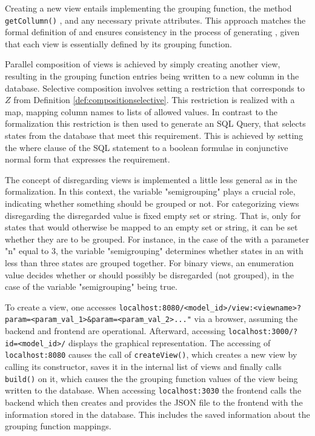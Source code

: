 \documentclass[preview]{standalone}
\begin{document}
Creating a new view entails implementing the grouping function, the method \texttt{getCollumn()} , and any necessary private attributes. This approach matches the formal definition of \viewsN and ensures consistency in the process of generating \viewsN, given that each view is essentially defined by its grouping function.

Parallel composition of views is achieved by simply creating another view, resulting in the grouping function entries being written to a new column in the database. Selective composition involves setting a  restriction that corresponds to $Z$ from Definition \ref{def:compositionselective}. This restriction is realized with a map, mapping column names to lists of allowed values. In contrast to the formalization this restriction is then used to generate an SQL Query, that selects states from the database that meet this requirement. This is achieved by setting the where clause of the SQL statement to a boolean formulae in conjunctive normal form that expresses the requirement.

The concept of disregarding views is implemented a little less general as in the formalization. In this context, the variable "semigrouping" plays a crucial role, indicating whether something should be grouped or not. For categorizing views disregarding the disregarded value is fixed empty set or string. That is, only for states that would otherwise be mapped to an empty set or string, it can be set whether they are to be grouped. For instance, in the case of the \viewN \viewscc with a parameter "n" equal to 3, the variable "semigrouping" determines whether states in an \sccN with less than three states are grouped together. For binary views, an enumeration value decides whether \hasppty or \notppty should possibly be disregarded (not grouped), in the case of the variable "semigrouping" being true.

To create a view, one accesses \nolinkurl{localhost:8080/<model\_id>/view:<viewname>?param=<param\_val\_1>\&param=<param\_val\_2>..."} via a browser, assuming the backend and frontend are operational. Afterward, accessing \nolinkurl{localhost:3000/?id=<model\_id>/} displays the graphical \viewN representation. The accessing of \nolinkurl{localhost:8080} causes the call of \texttt{createView()}, which creates a new view by calling its constructor, saves it in the internal list of views and finally calls \texttt{build()} on it, which causes the the grouping function values of the view being written to the database. When accessing \nolinkurl{localhost:3030} the frontend calls the backend which then creates and provides the JSON file to the frontend with the information stored in the database. This includes the saved information about the grouping function mappings.
\end{document}
